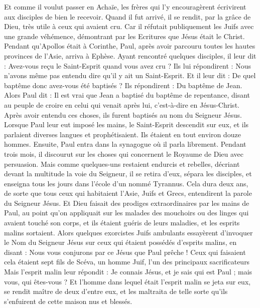 \begin{multicols}{2}
Et comme il voulut passer en Achaïe, les frères qui l'y encouragèrent écrivirent aux disciples de bien le recevoir. Quand il fut arrivé, il se rendit, par la grâce de Dieu, très utile à ceux qui avaient cru.
Car il réfutait publiquement les Juifs avec une grande véhémence, démontrant par les Ecritures que Jésus était le Christ.
\VerseOne{}Pendant qu'Apollos était à Corinthe, Paul, après avoir parcouru toutes les hautes provinces de l'Asie, arriva à Ephèse. Ayant rencontré quelques disciples, il leur dit :
Avez-vous reçu le Saint-Esprit quand vous avez cru ? Ils lui répondirent : Nous n'avons même pas entendu dire qu'il y ait un Saint-Esprit.
Et il leur dit : De quel baptême donc avez-vous été baptisés ? Ils répondirent : Du baptême de Jean.
Alors Paul dit : Il est vrai que Jean a baptisé du baptême de repentance, disant au peuple de croire en celui qui venait après lui, c'est-à-dire en Jésus-Christ.
Après avoir entendu ces choses, ils furent baptisés au nom du Seigneur Jésus.
Lorsque Paul leur eut imposé les mains, le Saint-Esprit descendit sur eux, et ils parlaient diverses langues et prophétisaient.
Ils étaient en tout environ douze hommes.
Ensuite, Paul entra dans la synagogue où il parla librement. Pendant trois mois, il discourut sur les choses qui concernent le Royaume de Dieu avec persuasion.
Mais comme quelques-uns restaient endurcis et rebelles, décriant devant la multitude la voie du Seigneur, il se retira d'eux, sépara les disciples, et enseigna tous les jours dans l'école d'un nommé Tyrannus.
Cela dura deux ans, de sorte que tous ceux qui habitaient l'Asie, Juifs et Grecs, entendirent la parole du Seigneur Jésus.
Et Dieu faisait des prodiges extraordinaires par les mains de Paul,
au point qu'on appliquait sur les malades des mouchoirs ou des linges qui avaient touché son corps, et ils étaient guéris de leurs maladies, et les esprits malins sortaient.
Alors quelques exorcistes Juifs ambulants essayèrent d'invoquer le Nom du Seigneur Jésus sur ceux qui étaient possédés d'esprits malins, en disant : Nous vous conjurons par ce Jésus que Paul prêche !
Ceux qui faisaient cela étaient sept fils de Scéva, un homme Juif, l'un des principaux sacrificateurs
Mais l'esprit malin leur répondit : Je connais Jésus, et je sais qui est Paul ; mais vous, qui êtes-vous ?
Et l'homme dans lequel était l'esprit malin se jeta sur eux, se rendit maître de deux d'entre eux, et les maltraita de telle sorte qu'ils s'enfuirent de cette maison nus et blessés.

\end{multicols}
